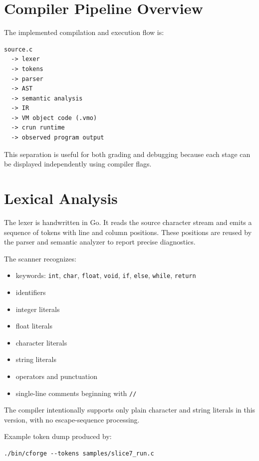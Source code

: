 \documentclass[11pt,a4paper]{article}
\begin{document}
\section{Compiler Pipeline Overview}

The implemented compilation and execution flow is:

\begin{lstlisting}
source.c
  -> lexer
  -> tokens
  -> parser
  -> AST
  -> semantic analysis
  -> IR
  -> VM object code (.vmo)
  -> crun runtime
  -> observed program output
\end{lstlisting}

This separation is useful for both grading and debugging because each stage can
be displayed independently using compiler flags.

\section{Lexical Analysis}

The lexer is handwritten in Go. It reads the source character stream and emits a
sequence of tokens with line and column positions. These positions are reused by
the parser and semantic analyzer to report precise diagnostics.

The scanner recognizes:

\begin{itemize}[leftmargin=2em]
    \item keywords: \texttt{int}, \texttt{char}, \texttt{float}, \texttt{void},
    \texttt{if}, \texttt{else}, \texttt{while}, \texttt{return}
    \item identifiers
    \item integer literals
    \item float literals
    \item character literals
    \item string literals
    \item operators and punctuation
    \item single-line comments beginning with \texttt{//}
\end{itemize}

The compiler intentionally supports only plain character and string literals in
this version, with no escape-sequence processing.

Example token dump produced by:

\begin{lstlisting}
./bin/cforge --tokens samples/slice7_run.c
\end{lstlisting}
\end{document}
